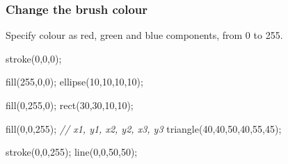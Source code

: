 \documentclass[ignorenonframetext,]{beamer}
\newenvironment{Shaded}{}{}
\newcommand{\DecValTok}[1]{\textcolor[rgb]{0.25,0.63,0.44}{{#1}}}
\newcommand{\CommentTok}[1]{\textcolor[rgb]{0.38,0.63,0.69}{\textit{{#1}}}}
\newcommand{\FunctionTok}[1]{\textcolor[rgb]{0.02,0.16,0.49}{{#1}}}
\newcommand{\NormalTok}[1]{{#1}}
\begin{document}
\begin{frame}[fragile]\frametitle{Change the brush colour}

Specify colour as red, green and blue components, from 0 to 255.

\begin{Shaded}
\begin{Highlighting}[]
\FunctionTok{stroke}\NormalTok{(}\DecValTok{0}\NormalTok{,}\DecValTok{0}\NormalTok{,}\DecValTok{0}\NormalTok{);}

\FunctionTok{fill}\NormalTok{(}\DecValTok{255}\NormalTok{,}\DecValTok{0}\NormalTok{,}\DecValTok{0}\NormalTok{);}
\FunctionTok{ellipse}\NormalTok{(}\DecValTok{10}\NormalTok{,}\DecValTok{10}\NormalTok{,}\DecValTok{10}\NormalTok{,}\DecValTok{10}\NormalTok{);}

\FunctionTok{fill}\NormalTok{(}\DecValTok{0}\NormalTok{,}\DecValTok{255}\NormalTok{,}\DecValTok{0}\NormalTok{);}
\FunctionTok{rect}\NormalTok{(}\DecValTok{30}\NormalTok{,}\DecValTok{30}\NormalTok{,}\DecValTok{10}\NormalTok{,}\DecValTok{10}\NormalTok{);}

\FunctionTok{fill}\NormalTok{(}\DecValTok{0}\NormalTok{,}\DecValTok{0}\NormalTok{,}\DecValTok{255}\NormalTok{);}
\CommentTok{// x1, y1, x2, y2, x3, y3}
\FunctionTok{triangle}\NormalTok{(}\DecValTok{40}\NormalTok{,}\DecValTok{40}\NormalTok{,}\DecValTok{50}\NormalTok{,}\DecValTok{40}\NormalTok{,}\DecValTok{55}\NormalTok{,}\DecValTok{45}\NormalTok{);}

\FunctionTok{stroke}\NormalTok{(}\DecValTok{0}\NormalTok{,}\DecValTok{0}\NormalTok{,}\DecValTok{255}\NormalTok{);}
\FunctionTok{line}\NormalTok{(}\DecValTok{0}\NormalTok{,}\DecValTok{0}\NormalTok{,}\DecValTok{50}\NormalTok{,}\DecValTok{50}\NormalTok{);}
\end{Highlighting}
\end{Shaded}

\end{frame}
\end{document}
